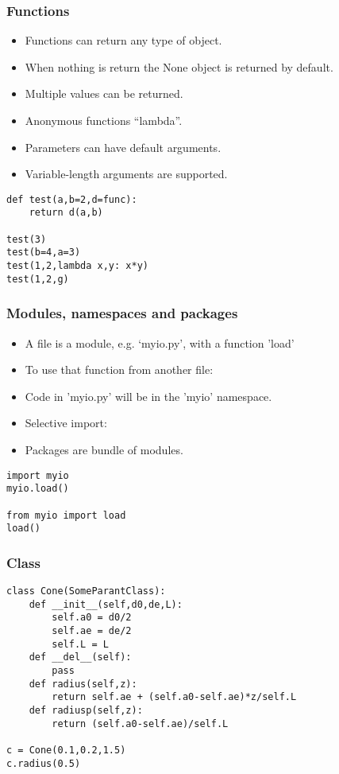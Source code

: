 \begin{frame}[fragile]\frametitle{Functions}

  \begin{itemize}
  \item Functions can return any type of object.
  \item When nothing is return the None object is returned by default.
  \item Multiple values can be returned.
  \item Anonymous functions ``lambda''.
  \item Parameters can have default arguments.
  \item Variable-length arguments are supported.
  \end{itemize}
	
	  \begin{lstlisting}
def test(a,b=2,d=func):
    return d(a,b)
	
test(3)
test(b=4,a=3)
test(1,2,lambda x,y: x*y)
test(1,2,g)
  \end{lstlisting}
\end{frame}

\begin{frame}[fragile]\frametitle{Modules, namespaces and packages}

  \begin{itemize}
  \item A file is a module, e.g. `myio.py', with a function 'load'
  \item To use that function from another file:

  \item Code in 'myio.py' will be in the 'myio' namespace.
  \item Selective import:

\item  Packages are bundle of modules.
  \end{itemize}
	
\begin{lstlisting}
import myio
myio.load()

from myio import load
load()
  \end{lstlisting}
\end{frame}

\begin{frame}[fragile]\frametitle{Class}
  \begin{lstlisting}
class Cone(SomeParantClass):
	def __init__(self,d0,de,L):
		self.a0 = d0/2
		self.ae = de/2
		self.L = L
	def __del__(self):
		pass
	def radius(self,z):
		return self.ae + (self.a0-self.ae)*z/self.L
	def radiusp(self,z):
		return (self.a0-self.ae)/self.L

c = Cone(0.1,0.2,1.5)
c.radius(0.5)
  \end{lstlisting}

\end{frame}

